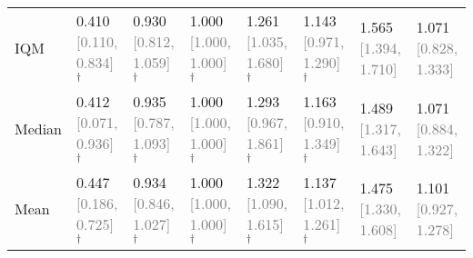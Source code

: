 \begin{table}[h]
{{\begin{tabular}{llllllll}
IQM & 0.410 \textcolor{gray}{[0.110, 0.834]}$^\dagger$ & 0.930 \textcolor{gray}{[0.812, 1.059]}$^\dagger$ & 1.000 \textcolor{gray}{[1.000, 1.000]}$^\dagger$ & 1.261 \textcolor{gray}{[1.035, 1.680]}$^\dagger$ & 1.143 \textcolor{gray}{[0.971, 1.290]}$^\dagger$ & 1.565 \textcolor{gray}{[1.394, 1.710]} & 1.071 \textcolor{gray}{[0.828, 1.333]} \\
Median & 0.412 \textcolor{gray}{[0.071, 0.936]}$^\dagger$ & 0.935 \textcolor{gray}{[0.787, 1.093]}$^\dagger$ & 1.000 \textcolor{gray}{[1.000, 1.000]}$^\dagger$ & 1.293 \textcolor{gray}{[0.967, 1.861]}$^\dagger$ & 1.163 \textcolor{gray}{[0.910, 1.349]}$^\dagger$ & 1.489 \textcolor{gray}{[1.317, 1.643]} & 1.071 \textcolor{gray}{[0.884, 1.322]} \\
Mean & 0.447 \textcolor{gray}{[0.186, 0.725]}$^\dagger$ & 0.934 \textcolor{gray}{[0.846, 1.027]}$^\dagger$ & 1.000 \textcolor{gray}{[1.000, 1.000]}$^\dagger$ & 1.322 \textcolor{gray}{[1.090, 1.615]}$^\dagger$ & 1.137 \textcolor{gray}{[1.012, 1.261]}$^\dagger$ & 1.475 \textcolor{gray}{[1.330, 1.608]} & 1.101 \textcolor{gray}{[0.927, 1.278]} \\
\bottomrule
\end{tabular}
}
}
\end{table}